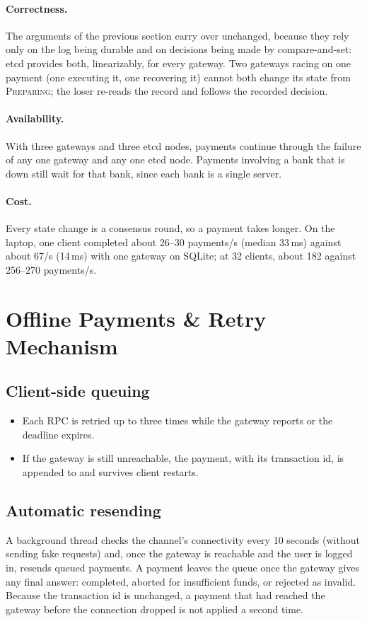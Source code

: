 \documentclass[11pt]{article}
\newcommand{\code}[1]{\texttt{\detokenize{#1}}}
\newcommand{\st}[1]{\textsc{#1}}
\begin{document}
\paragraph{Correctness.}
The arguments of the previous section carry over unchanged, because they rely
only on the log being durable and on decisions being made by compare-and-set:
etcd provides both, linearizably, for every gateway. Two gateways racing on one
payment (one executing it, one recovering it) cannot both change its state
from \st{Preparing}; the loser re-reads the record and follows the recorded
decision.

\paragraph{Availability.}
With three gateways and three etcd nodes, payments continue through the
failure of any one gateway and any one etcd node. Payments involving a bank
that is down still wait for that bank, since each bank is a single server.

\paragraph{Cost.}
Every state change is a consensus round, so a payment takes longer. On the
laptop, one client completed about 26--30 payments/s (median 33\,ms) against
about 67/s (14\,ms) with one gateway on SQLite; at 32 clients, about 182
against 256--270 payments/s.

\section{Offline Payments \& Retry Mechanism}
\label{sec:offline}

\subsection{Client-side queuing}
\begin{itemize}
  \item Each RPC is retried up to three times while the gateway reports
        \code{UNAVAILABLE} or the deadline expires.
  \item If the gateway is still unreachable, the payment, with its transaction
        id, is appended to \code{offline_payments.json} and survives client
        restarts.
\end{itemize}

\subsection{Automatic resending}
A background thread checks the channel's connectivity every 10 seconds (without
sending fake requests) and, once the gateway is reachable and the user is logged
in, resends queued payments. A payment leaves the queue once the gateway gives
any final answer: completed, aborted for insufficient funds, or rejected as
invalid. Because the transaction id is unchanged, a payment that had reached the
gateway before the connection dropped is not applied a second time.
\end{document}
